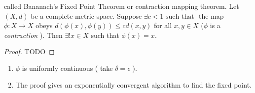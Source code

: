 \begin{thm}[23]
	called Bananach's Fixed Point Theorem or contraction mapping theorem.
	Let $(X,d)$ be a complete metric space. Suppose $\exists{c < 1} \text{ such that } $ the map $\phi:X\to X$ obeys $d(\phi(x),\phi(y))\le c d(x,y)$ for all $x,y \in X$ ($\phi$ is a \textit{ contraction }).
	Then $\exists{!} x \in X$ such that $\phi(x) = x$.
	\begin{proof}
		TODO
	\end{proof}
	\begin{remark}
		\begin{enumerate}
			\item $\phi$ is uniformly continuous ( take $\delta=\epsilon$ ).
			\item The proof gives an exponentially convergent algorithm to find the fixed point.
		\end{enumerate}
	\end{remark}
\end{thm}
